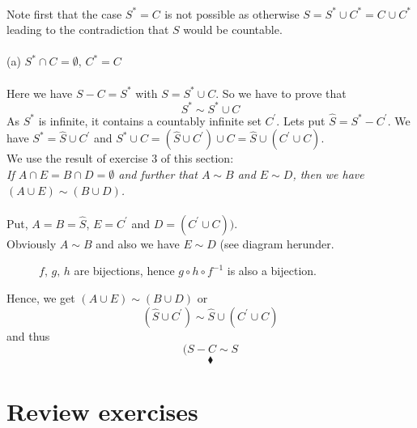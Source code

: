 \begin{figure}[H]%
    \centering
    \subfloat[$S^{*}\cap C^{}=\emptyset,\,C^{*}= C^{} $]{}
     \\  		                     	\subfloat[$S^{*}\cap C^{}\neq\emptyset,\,C^{*}\cap C^{}=\emptyset $]{}
    	\subfloat[$S^{*}\cap C^{}=\emptyset,\,C^{*}\cap C^{}\neq\emptyset,\,C^{*}\neq C^{} $]{}
\label{fig:fig_p3}
\end{figure}
Note first that the case $S^{*}= C^{}$ is not possible as otherwise $S= S^{*}\cup  C^{*}= C^{}\cup  C^{*}$ leading to the contradiction that $S$ would be countable.\\\\
(a) $S^{*}\cap C^{}=\emptyset,\,C^{*}= C^{} $\\\\
Here we have $S-C= S^{*}$ with $S= S^{*}\cup C$. So we have to prove that $$S^{*}\sim S^{*}\cup C$$
As $S^{*}$ is infinite, it contains a countably infinite set $C^{'}$. Lets put $\hat{S}= S^{*}-C^{'}$. We have $S^{*}= \hat{S}\cup C^{'}$ and $S^{*}\cup C= (\hat{S}\cup C^{'})\cup C = \hat{S}\cup (C^{'}\cup C)$. \\
We use the result of exercise $3$ of this section:\\
\textit{If $A \cap E = B\cap D=\emptyset$ and further that $A\sim  B$ and $E\sim  D$, then we have  $(A \cup E) \sim (B\cup  D)$.\\}\\
Put, $A= B=\hat{S}$, $ E= C^{'}$ and $D=  (C^{'}\cup C))$.\\
Obviously $A\sim B$ and also we have $E\sim D$ (see diagram herunder.
\begin{figure}[H]%
    \centering
    
\caption{$f,\, g ,\, h$ are bijections, hence $g\circ h\circ f^{-1}$ is also a bijection.}
\label{fig:fig_p8b}
\end{figure}
Hence, we get $(A \cup E) \sim (B\cup  D)$ or
$$(\hat{S} \cup C^{'}) \sim \hat{S}\cup  (C^{'}\cup C)$$
and thus
$$(S-C \sim S$$
$$\blacklozenge$$

\newpage
\setcounter{section}{28}
 \section{Review exercises}
 \renewcommand{\thesubsection}{\thesection.\RomanNumeralCaps{1}}
